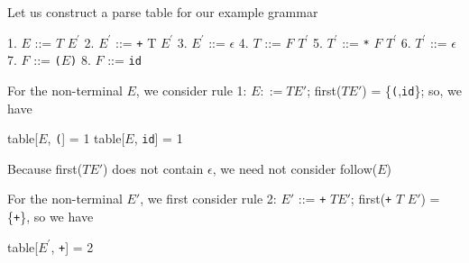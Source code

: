 \documentclass[8pt,a4paper,compress]{beamer}
\newcommand{\mm}[1]{$#1$}
\newcommand{\expo}[2]{$#1^{#2}$}
\newenvironment{spaced}
{
\smallskip
\hspace{.5cm}
\begin{minipage}[c]{\textwidth}
}
{
\end{minipage}
\smallskip
}
\begin{document}
\begin{frame}[fragile]
\pause

Let us construct a parse table for our example grammar

\text{ }
\begin{spaced}
\begin{production}
1. \mm{E}  ::= \mm{T} \expo{E}{\prime}
2. \expo{E}{\prime} ::= \lstinline{+} T \expo{E}{\prime}
3. \expo{E}{\prime} ::= \mm{\epsilon}
4. \mm{T}  ::= \mm{F} \expo{T}{\prime}
5. \expo{T}{\prime} ::= \lstinline{*} \mm{F} \expo{T}{\prime}
6. \expo{T}{\prime} ::= \mm{\epsilon}
7. \mm{F}  ::= \lstinline{(}\mm{E}\lstinline{)}
8. \mm{F}  ::= \lstinline{id}
\end{production}
\end{spaced}

\pause

For the non-terminal $E$, we consider rule 1: $E  ::= T E'$;  first($T E'$) = \{\lstinline{(},\lstinline{id}\}; so, we have

\text{ }
\begin{spaced}
\begin{production}
table[\mm{E}, \lstinline{(}] = 1
table[\mm{E}, \lstinline{id}] = 1
\end{production}
\end{spaced}

\pause

Because first($T E'$) does not contain $\epsilon$, we need not consider follow($E$)

\pause
\bigskip

For the non-terminal $E'$, we first consider rule 2: $E'$ ::= \lstinline{+} $T E'$; first(\lstinline{+} $T$ $E'$) = \{\lstinline{+}\}, so we have

\text{ }
\begin{spaced}
\begin{production}
table[\expo{E}{\prime}, \lstinline{+}] = 2
\end{production}
\end{spaced}
\end{frame}
\end{document}
